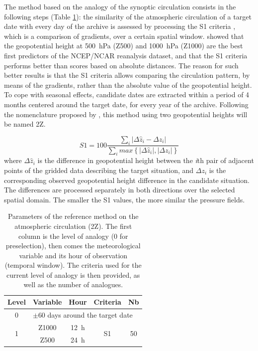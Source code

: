 \documentclass[review]{elsarticle}
\begin{document}
The method based on the analogy of the synoptic circulation consists in the following steps (Table \ref{table:params_R1}): the similarity of the atmospheric circulation of a target date with every day of the archive is assessed by processing the S1 criteria \citep[Eq.\ \ref{eq:S1}, ][]{Teweles1954, Drosdowsky2003}, which is a comparison of gradients, over a certain spatial window. \citet{Bontron2005} showed that the geopotential height at 500~hPa (Z500) and 1000~hPa (Z1000) are the best first predictors of the NCEP/NCAR reanalysis dataset, and that the S1 criteria performs better than scores based on absolute distances. The reason for such better results is that the S1 criteria allows comparing the circulation pattern, by means of the gradients, rather than the absolute value of the geopotential height. To cope with seasonal effects, candidate dates are extracted within a period of 4 months centered around the target date, for every year of the archive. Following the nomenclature proposed by \citet{Horton2016}, this method using two geopotential heights will be named 2Z.

\begin{equation}
\label{eq:S1}
S1=100 \frac {\displaystyle \sum_{i} \vert \Delta\hat{z}_{i} - \Delta z_{i} \vert}
{\displaystyle \sum_{i} max\left\lbrace \vert \Delta\hat{z}_{i} \vert , \vert \Delta z_{i} \vert \right\rbrace }
\end{equation}
where $\Delta \hat{z}_{i}$ is the difference in geopotential height between the \textit{i}th pair of adjacent points of the gridded data describing the target situation, and $\Delta z_{i}$ is the corresponding observed geopotential height difference in the candidate situation. The differences are processed separately in both directions over the selected spatial domain. The smaller the S1 values, the more similar the pressure fields.

\begin{table}[htb]
	\caption{Parameters of the reference method on the atmospheric circulation (2Z). The first column is the level of analogy (0 for preselection), then comes the meteorological variable and its hour of observation (temporal window). The criteria used for the current level of analogy is then provided, as well as the number of analogues.}
	\footnotesize
	\begin{center}
		\begin{tabular}{ccccc}
			\hline
			Level & Variable & Hour & Criteria & Nb \\ 
			\hline 
			0 & \multicolumn{4}{l}{$\pm 60$ days around the target date} \\
			\hline 
			\multirow{2}{*}{1} & Z1000 & 12~h & \multirow{2}{*}{S1} & \multirow{2}{*}{50} \\
			& Z500 & 24~h & & \\ 
			\hline 
		\end{tabular} 
	\end{center}
	\label{table:params_R1}
\end{table}
\end{document}
